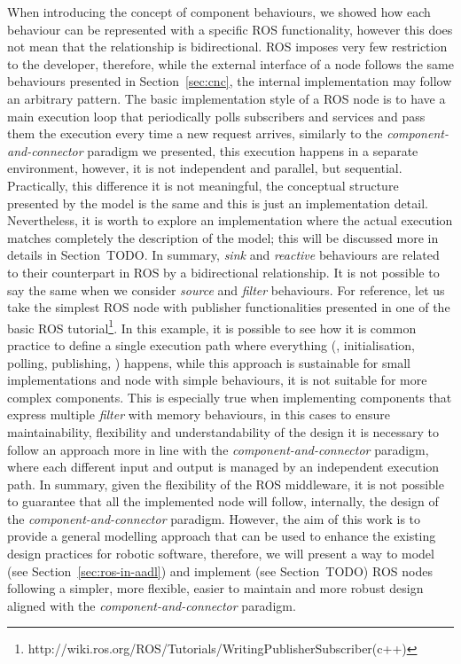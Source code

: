 When introducing the concept of component behaviours, we showed how each behaviour can be represented with a specific ROS functionality, however this does not mean that the relationship is bidirectional. ROS imposes very few restriction to the developer, therefore, while the external interface of a node follows the same behaviours presented in Section~\ref{sec:cnc}, the internal implementation may follow an arbitrary pattern. The basic implementation style of a ROS node is to have a main execution loop that periodically polls subscribers and services and pass them the execution every time a new request arrives, similarly to the \textit{component-and-connector} paradigm we presented, this execution happens in a separate environment, however, it is not independent and parallel, but sequential. Practically, this difference it is not meaningful, the conceptual structure presented by the model is the same and this is just an implementation detail. Nevertheless, it is worth to explore an implementation where the actual execution matches completely the description of the model; this will be discussed more in details in Section~TODO. In summary, \textit{sink} and \textit{reactive} behaviours are related to their counterpart in ROS by a bidirectional relationship. It is not possible to say the same when we consider \textit{source} and \textit{filter} behaviours. For reference, let us take the simplest ROS node with publisher functionalities presented in one of the basic ROS tutorial\footnote{http://wiki.ros.org/ROS/Tutorials/WritingPublisherSubscriber(c++)}. In this example, it is possible to see how it is common practice to define a single execution path where everything (\eg, initialisation, polling, publishing, \etc) happens, while this approach is sustainable for small implementations and node with simple behaviours,  it is not suitable for more complex components. This is especially true when implementing components that express multiple \textit{filter} with memory behaviours, in this cases to ensure maintainability, flexibility and understandability of the design it is necessary to follow an approach more in line with the \textit{component-and-connector} paradigm, where each different input and output is managed by an independent execution path. In summary, given the flexibility of the ROS middleware, it is not possible to guarantee that all the implemented node will follow, internally, the design of the \textit{component-and-connector} paradigm. However, the aim of this work is to provide a general modelling approach that can be used to enhance the existing design practices for robotic software, therefore, we will present a way to model (see Section~\ref{sec:ros-in-aadl}) and implement (see Section~TODO) ROS nodes following a simpler, more flexible, easier to maintain and more robust design aligned with the \textit{component-and-connector} paradigm.

